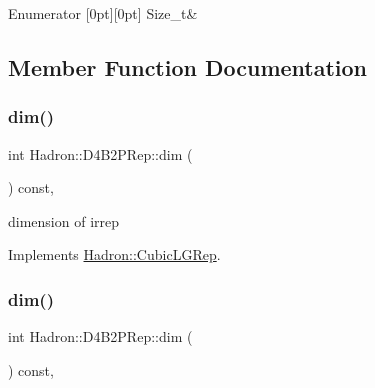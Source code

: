 \begin{DoxyEnumFields}{Enumerator}
[0pt][0pt]{}\mbox{\label{structHadron_1_1D4B2PRep_a839baea5b3c96ccb55b0e2e795cd7690aeb48c5ef339d21027988633769435355}} 
Size\+\_\+t&\\
\hline

\end{DoxyEnumFields}


\subsection{Member Function Documentation}
\mbox{\label{structHadron_1_1D4B2PRep_a7618d0e6ba704200dac6e55ca799a815}} 
\subsubsection{\texorpdfstring{dim()}{dim()}\hspace{0.1cm}{\footnotesize\ttfamily [1/3]}}
{\footnotesize\ttfamily int Hadron\+::\+D4\+B2\+P\+Rep\+::dim (\begin{DoxyParamCaption}{ }\end{DoxyParamCaption}) const\hspace{0.3cm}{\ttfamily [inline]}, {\ttfamily [virtual]}}

dimension of irrep 

Implements \mbox{\hyperlink{structHadron_1_1CubicLGRep_a3acbaea26503ed64f20df693a48e4cdd}{Hadron\+::\+Cubic\+L\+G\+Rep}}.

\mbox{\label{structHadron_1_1D4B2PRep_a7618d0e6ba704200dac6e55ca799a815}} 
\subsubsection{\texorpdfstring{dim()}{dim()}\hspace{0.1cm}{\footnotesize\ttfamily [2/3]}}
{\footnotesize\ttfamily int Hadron\+::\+D4\+B2\+P\+Rep\+::dim (\begin{DoxyParamCaption}{ }\end{DoxyParamCaption}) const\hspace{0.3cm}{\ttfamily [inline]}, {\ttfamily [virtual]}}

